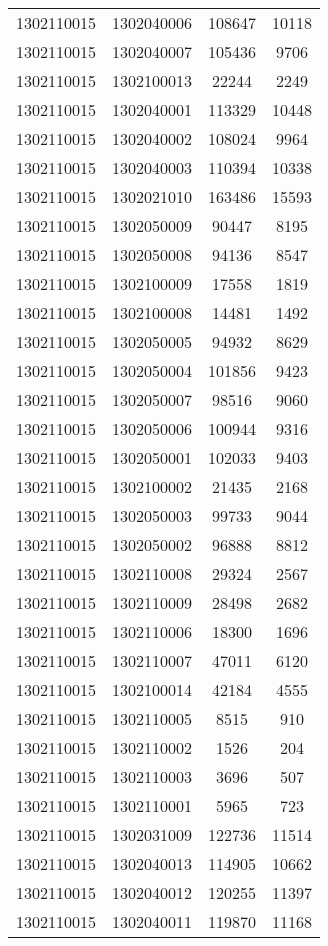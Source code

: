 \begin{longtable}{llcc}
1302110015 & 1302040006 & 108647 & 10118\\
1302110015 & 1302040007 & 105436 & 9706\\
1302110015 & 1302100013 & 22244 & 2249\\
1302110015 & 1302040001 & 113329 & 10448\\
1302110015 & 1302040002 & 108024 & 9964\\
1302110015 & 1302040003 & 110394 & 10338\\
1302110015 & 1302021010 & 163486 & 15593\\
1302110015 & 1302050009 & 90447 & 8195\\
1302110015 & 1302050008 & 94136 & 8547\\
1302110015 & 1302100009 & 17558 & 1819\\
1302110015 & 1302100008 & 14481 & 1492\\
1302110015 & 1302050005 & 94932 & 8629\\
1302110015 & 1302050004 & 101856 & 9423\\
1302110015 & 1302050007 & 98516 & 9060\\
1302110015 & 1302050006 & 100944 & 9316\\
1302110015 & 1302050001 & 102033 & 9403\\
1302110015 & 1302100002 & 21435 & 2168\\
1302110015 & 1302050003 & 99733 & 9044\\
1302110015 & 1302050002 & 96888 & 8812\\
1302110015 & 1302110008 & 29324 & 2567\\
1302110015 & 1302110009 & 28498 & 2682\\
1302110015 & 1302110006 & 18300 & 1696\\
1302110015 & 1302110007 & 47011 & 6120\\
1302110015 & 1302100014 & 42184 & 4555\\
1302110015 & 1302110005 & 8515 & 910\\
1302110015 & 1302110002 & 1526 & 204\\
1302110015 & 1302110003 & 3696 & 507\\
1302110015 & 1302110001 & 5965 & 723\\
1302110015 & 1302031009 & 122736 & 11514\\
1302110015 & 1302040013 & 114905 & 10662\\
1302110015 & 1302040012 & 120255 & 11397\\
1302110015 & 1302040011 & 119870 & 11168\\

\end{longtable}
